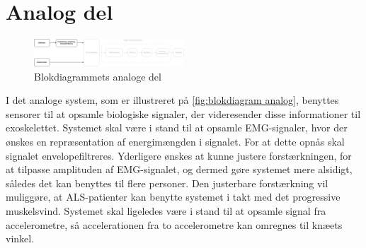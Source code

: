 \section{Analog del}
\begin{figure}[H]
\centering
\includegraphics[width=0.5\textwidth]{figures/implementering/Blokdiagram_analog.png}
\caption{Blokdiagrammets analoge del}
\label{fig:blokdiagram analog}
\end{figure}

\noindent
I det analoge system, som er illustreret på \autoref{fig:blokdiagram analog}, benyttes sensorer til at opsamle biologiske signaler, der videresender disse informationer til exoskelettet. Systemet skal være i stand til at opsamle EMG-signaler, hvor der ønskes en repræsentation af energimængden i signalet. For at dette opnås skal signalet envelopefiltreres. Yderligere ønskes at kunne justere forstærkningen, for at tilpasse amplituden af EMG-signalet, og dermed gøre systemet mere alsidigt, således det kan benyttes til flere personer. Den justerbare forstærkning vil muliggøre, at ALS-patienter kan benytte systemet i takt med det progressive muskelsvind.
Systemet skal ligeledes være i stand til at opsamle signal fra accelerometre, så accelerationen fra to accelerometre kan omregnes til knæets vinkel.
